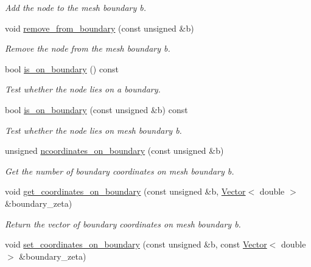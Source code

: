 \begin{DoxyCompactItemize}
\begin{DoxyCompactList}\small\item\em Add the node to the mesh boundary b. \end{DoxyCompactList}\item 
void \hyperlink{classoomph_1_1BoundaryNodeBase_ab2b651cea5e5e0ec02183e6ab1b3c9b7}{remove\+\_\+from\+\_\+boundary} (const unsigned \&b)
\begin{DoxyCompactList}\small\item\em Remove the node from the mesh boundary b. \end{DoxyCompactList}\item 
bool \hyperlink{classoomph_1_1BoundaryNodeBase_aa977a1295a422bf0bd44944ae056ff96}{is\+\_\+on\+\_\+boundary} () const
\begin{DoxyCompactList}\small\item\em Test whether the node lies on a boundary. \end{DoxyCompactList}\item 
bool \hyperlink{classoomph_1_1BoundaryNodeBase_a90a976e520409d6c6fb0b1948c618294}{is\+\_\+on\+\_\+boundary} (const unsigned \&b) const
\begin{DoxyCompactList}\small\item\em Test whether the node lies on mesh boundary b. \end{DoxyCompactList}\item 
unsigned \hyperlink{classoomph_1_1BoundaryNodeBase_a0a623123c46cafc3e81ede1a981c8663}{ncoordinates\+\_\+on\+\_\+boundary} (const unsigned \&b)
\begin{DoxyCompactList}\small\item\em Get the number of boundary coordinates on mesh boundary b. \end{DoxyCompactList}\item 
void \hyperlink{classoomph_1_1BoundaryNodeBase_a4c0397f720292ff195f32332f284cd8f}{get\+\_\+coordinates\+\_\+on\+\_\+boundary} (const unsigned \&b, \hyperlink{classoomph_1_1Vector}{Vector}$<$ double $>$ \&boundary\+\_\+zeta)
\begin{DoxyCompactList}\small\item\em Return the vector of boundary coordinates on mesh boundary b. \end{DoxyCompactList}\item 
void \hyperlink{classoomph_1_1BoundaryNodeBase_a2dfc687fb793ef32693282a08c012d30}{set\+\_\+coordinates\+\_\+on\+\_\+boundary} (const unsigned \&b, const \hyperlink{classoomph_1_1Vector}{Vector}$<$ double $>$ \&boundary\+\_\+zeta)

\end{DoxyCompactItemize}

